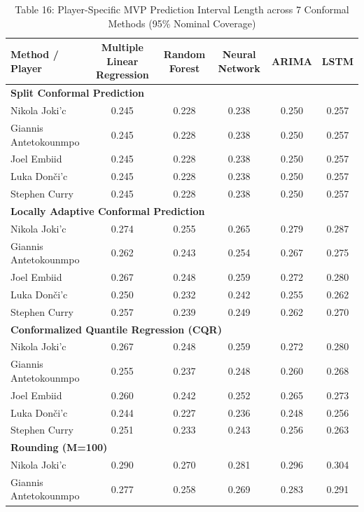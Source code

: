 \documentclass[11pt,a4paper]{article}
\begin{document}
\begin{table}[H]
\centering
\caption{Table 16: Player-Specific MVP Prediction Interval Length across 7 Conformal Methods (95\% Nominal Coverage)}
\label{tab:mvp_star_len_95}
\scriptsize
\begin{tabular}{lccccc}
\toprule
Method / Player & Multiple Linear Regression & Random Forest & Neural Network & ARIMA & LSTM \\
\midrule
\multicolumn{6}{l}{\textbf{Split Conformal Prediction}} \\
\midrule
Nikola Joki'{c} & 0.245 & 0.228 & 0.238 & 0.250 & 0.257 \\
Giannis Antetokounmpo & 0.245 & 0.228 & 0.238 & 0.250 & 0.257 \\
Joel Embiid & 0.245 & 0.228 & 0.238 & 0.250 & 0.257 \\
Luka Don\v{c}i'{c} & 0.245 & 0.228 & 0.238 & 0.250 & 0.257 \\
Stephen Curry & 0.245 & 0.228 & 0.238 & 0.250 & 0.257 \\
\midrule
\multicolumn{6}{l}{\textbf{Locally Adaptive Conformal Prediction}} \\
\midrule
Nikola Joki'{c} & 0.274 & 0.255 & 0.265 & 0.279 & 0.287 \\
Giannis Antetokounmpo & 0.262 & 0.243 & 0.254 & 0.267 & 0.275 \\
Joel Embiid & 0.267 & 0.248 & 0.259 & 0.272 & 0.280 \\
Luka Don\v{c}i'{c} & 0.250 & 0.232 & 0.242 & 0.255 & 0.262 \\
Stephen Curry & 0.257 & 0.239 & 0.249 & 0.262 & 0.270 \\
\midrule
\multicolumn{6}{l}{\textbf{Conformalized Quantile Regression (CQR)}} \\
\midrule
Nikola Joki'{c} & 0.267 & 0.248 & 0.259 & 0.272 & 0.280 \\
Giannis Antetokounmpo & 0.255 & 0.237 & 0.248 & 0.260 & 0.268 \\
Joel Embiid & 0.260 & 0.242 & 0.252 & 0.265 & 0.273 \\
Luka Don\v{c}i'{c} & 0.244 & 0.227 & 0.236 & 0.248 & 0.256 \\
Stephen Curry & 0.251 & 0.233 & 0.243 & 0.256 & 0.263 \\
\midrule
\multicolumn{6}{l}{\textbf{Rounding (M=100)}} \\
\midrule
Nikola Joki'{c} & 0.290 & 0.270 & 0.281 & 0.296 & 0.304 \\
Giannis Antetokounmpo & 0.277 & 0.258 & 0.269 & 0.283 & 0.291 \\

\end{tabular}
\end{table}
\end{document}
